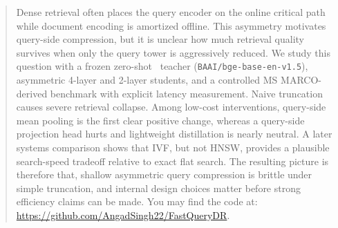 \begin{abstract}
Dense retrieval often places the query encoder on the online critical path while document encoding is amortized offline. This asymmetry motivates query-side compression, but it is unclear how much retrieval quality survives when only the query tower is aggressively reduced. We study this question with a frozen zero-shot \bgebase\ teacher (\texttt{BAAI/bge-base-en-v1.5}), asymmetric 4-layer and 2-layer students, and a controlled MS MARCO-derived benchmark with explicit latency measurement. Naive truncation causes severe retrieval collapse. Among low-cost interventions, query-side mean pooling is the first clear positive change, whereas a query-side projection head hurts and lightweight distillation is nearly neutral. A later systems comparison shows that IVF, but not HNSW, provides a plausible search-speed tradeoff relative to exact flat search. The resulting picture is therefore that, shallow asymmetric query compression is brittle under simple truncation, and internal design choices matter before strong efficiency claims can be made. You may find the code at: \url{https://github.com/AngadSingh22/FastQueryDR}.
\end{abstract}
